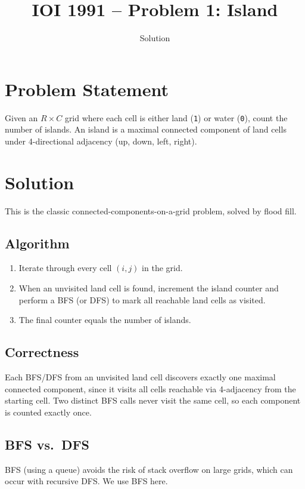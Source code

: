 \documentclass[11pt,a4paper]{article}
\title{IOI 1991 -- Problem 1: Island}
\author{Solution}
\date{}
\begin{document}
\maketitle

\section{Problem Statement}

Given an $R \times C$ grid where each cell is either land (\texttt{1}) or
water (\texttt{0}), count the number of islands. An island is a maximal
connected component of land cells under 4-directional adjacency (up, down,
left, right).

\section{Solution}

This is the classic connected-components-on-a-grid problem, solved by flood
fill.

\subsection{Algorithm}

\begin{enumerate}
  \item Iterate through every cell $(i, j)$ in the grid.
  \item When an unvisited land cell is found, increment the island counter
    and perform a BFS (or DFS) to mark all reachable land cells as visited.
  \item The final counter equals the number of islands.
\end{enumerate}

\subsection{Correctness}

Each BFS/DFS from an unvisited land cell discovers exactly one maximal
connected component, since it visits all cells reachable via 4-adjacency
from the starting cell. Two distinct BFS calls never visit the same cell,
so each component is counted exactly once.

\subsection{BFS vs.\ DFS}

BFS (using a queue) avoids the risk of stack overflow on large grids, which
can occur with recursive DFS. We use BFS here.
\end{document}
